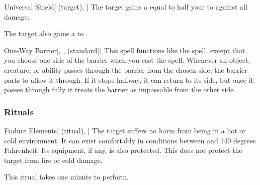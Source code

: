 \lowercase{\hypertarget{spell:Universal Shield}{}}\label{spell:Universal Shield}
\begin{attuneability}[Rank 6]{\hypertarget{spell:Universal Shield}{Universal Shield}}[ (target), ]
The target gains a  equal to half your  to  against all damage.

\rankline
{} The target also gains a   to .
\end{attuneability}
\vspace{0.25em}



\lowercase{\hypertarget{spell:One-Way Barrier}{}}\label{spell:One-Way Barrier}
\begin{freeability}[Rank 7]{\hypertarget{spell:One-Way Barrier}{One-Way Barrier}}[, ,  (standard)]
\targetrule
This spell functions like the  spell, except that you choose one side of the barrier when you cast the spell.
Whenever an object, creature, or ability passes through the barrier from the chosen side, the barrier parts to allow it through.
If it stops halfway, it can return to its side, but once it passes through fully it treats the barrier as impassable from the other side.
\end{freeability}
\vspace{0.25em}



\subsubsection{Rituals}


\lowercase{\hypertarget{spell:Endure Elements}{}}\label{spell:Endure Elements}
\begin{attuneability}[Rank 1]{\hypertarget{spell:Endure Elements}{Endure Elements}}[ (ritual), ]
The target suffers no harm from being in a hot or cold environment.
It can exist comfortably in conditions between  and 140 degrees Fahrenheit.
Its equipment, if any, is also protected.
This does not protect the target from fire or cold damage.

This ritual takes one minute to perform.
\end{attuneability}
\vspace{0.25em}



